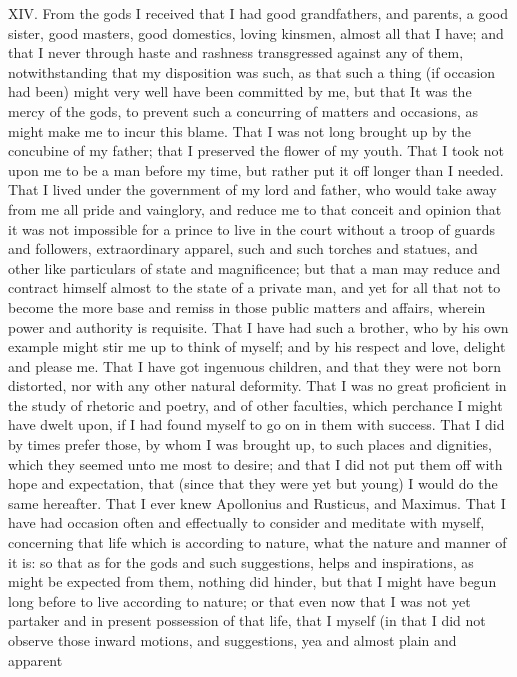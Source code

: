 XIV. From the gods I received that I had good grandfathers, and parents,
a good sister, good masters, good domestics, loving kinsmen, almost all
that I have; and that I never through haste and rashness transgressed
against any of them, notwithstanding that my disposition was such, as that
such a thing (if occasion had been) might very well have been committed by
me, but that It was the mercy of the gods, to prevent such a concurring of
matters and occasions, as might make me to incur this blame. That I was
not long brought up by the concubine of my father; that I preserved the
flower of my youth. That I took not upon me to be a man before my time,
but rather put it off longer than I needed. That I lived under the
government of my lord and father, who would take away from me all pride
and vainglory, and reduce me to that conceit and opinion that it was not
impossible for a prince to live in the court without a troop of guards and
followers, extraordinary apparel, such and such torches and statues, and
other like particulars of state and magnificence; but that a man may
reduce and contract himself almost to the state of a private man, and yet
for all that not to become the more base and remiss in those public
matters and affairs, wherein power and authority is requisite. That I have
had such a brother, who by his own example might stir me up to think of
myself; and by his respect and love, delight and please me. That I have
got ingenuous children, and that they were not born distorted, nor with
any other natural deformity. That I was no great proficient in the study
of rhetoric and poetry, and of other faculties, which perchance I might
have dwelt upon, if I had found myself to go on in them with success. That
I did by times prefer those, by whom I was brought up, to such places and
dignities, which they seemed unto me most to desire; and that I did not
put them off with hope and expectation, that (since that they were yet but
young) I would do the same hereafter. That I ever knew Apollonius and
Rusticus, and Maximus. That I have had occasion often and effectually to
consider and meditate with myself, concerning that life which is according
to nature, what the nature and manner of it is: so that as for the gods
and such suggestions, helps and inspirations, as might be expected from
them, nothing did hinder, but that I might have begun long before to live
according to nature; or that even now that I was not yet partaker and in
present possession of that life, that I myself (in that I did not observe
those inward motions, and suggestions, yea and almost plain and apparent

